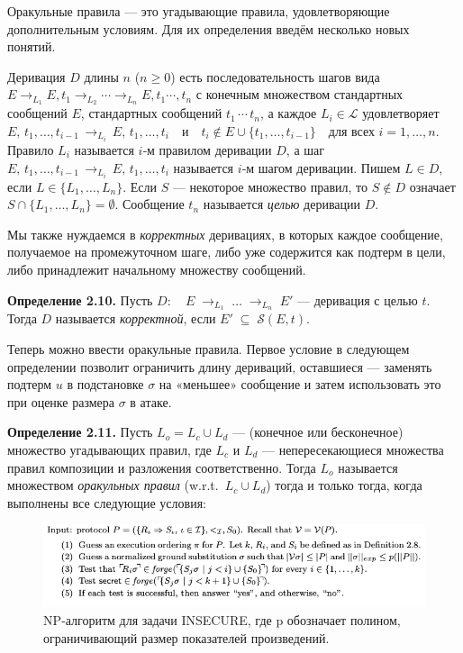 Оракульные правила — это угадывающие правила, удовлетворяющие дополнительным условиям. Для их определения введём несколько новых понятий.

Деривация \(D\) длины \(n\) (\(n\ge0\)) есть последовательность шагов вида
$E \to_{L_1} E, t_1 \to_{L_2} \cdots \to_{L_n} E, t_1 \cdots, t_n$ с конечным множеством стандартных сообщений $E$,
стандартных сообщений $t_1\, \cdots\, t_n$, а каждое $L_{i}\in\mathcal{L}$ удовлетворяет
$E,\,t_{1},\dots,t_{i-1}\,\to_{L_{i}}\,E,\,t_{1},\dots,t_{i}
\quad\text{и}\quad
t_{i}\notin E\cup\{t_{1},\dots,t_{i-1}\}
\quad\text{для всех }i=1,\dots,n.$ Правило $L_{i}$ называется $i$‑м правилом деривации $D$, а шаг
$E,\,t_{1},\dots,t_{i-1}\,\to_{L_{i}}\,E,\,t_{1},\dots,t_{i}$ называется $i$‑м шагом деривации.  
Пишем $L\in D$, если $L\in\{L_{1},\dots,L_{n}\}$.  
Если $S$ — некоторое множество правил, то $S\notin D$ означает
$S\cap\{L_{1},\dots,L_{n}\}=\emptyset$.  
Сообщение $t_{n}$ называется \emph{целью} деривации $D$.

Мы также нуждаемся в \textit{корректных} деривациях, в которых каждое сообщение, получаемое на промежуточном шаге, либо уже содержится как подтерм в цели, либо принадлежит начальному множеству сообщений.

\medskip
\noindent\textbf{Определение 2.10.} Пусть $D:\quad E \;\to_{L_{1}}\;\dots\;\to_{L_{n}}\;E'$
— деривация с целью \(t\). Тогда \(D\) называется \textit{корректной}, если
$E'\;\subseteq\;\mathcal{S}(E,t)$.

Теперь можно ввести оракульные правила. Первое условие в следующем определении позволит ограничить длину дериваций, оставшиеся — заменять подтерм \(u\) в подстановке \(\sigma\) на «меньшее» сообщение и затем использовать это при оценке размера \(\sigma\) в атаке.

\medskip
\noindent\textbf{Определение 2.11.} Пусть \(L_{o}=L_{c}\cup L_{d}\) — (конечное или бесконечное) множество угадывающих правил, где \(L_{c}\) и \(L_{d}\) — непересекающиеся множества правил композиции и разложения соответственно. Тогда \(L_{o}\) называется множеством \emph{оракульных правил} (w.r.t.\ \(L_{c}\cup L_{d}\)) тогда и только тогда, когда выполнены все следующие условия:

\begin{figure}
  \centering
  \includegraphics[scale=0.7]{assets/pic01.png}
  \caption{NP‑алгоритм для задачи INSECURE, где p обозначает полином, ограничивающий размер показателей произведений.}
  \label{fig:fig01}
\end{figure}

